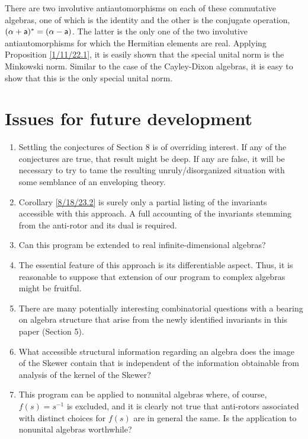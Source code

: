 \documentclass{amsart}
\theoremstyle{definition}
\numberwithin{theorem}{section}
\numberwithin{equation}{section}
\begin{document}
 There are two involutive antiautomorphisms on each of these commutative algebras, one of which is the identity and the other is the conjugate operation, $(\alpha+ {\sf a})^* = (\alpha- {\sf a})$. The latter is the only one of the two involutive antiautomorphisms  for which the Hermitian elements are real.  Applying Proposition \ref{1/11/22.1}, it is easily shown that the special unital norm is the Minkowski norm.  Similar to the case of the Cayley-Dixon algebras, it is easy to show that this is the only special unital norm.


\section{Issues for future development} 
\begin{enumerate}
\item Settling the conjectures of Section 8 is of overriding interest.  If any of the conjectures are true, that result might be deep.  If any are false, it will be necessary to try to tame the resulting unruly/disorganized situation with some semblance of an enveloping theory.
\item Corollary \ref{8/18/23.2} is surely only a partial listing of the invariants accessible with this approach.  A full accounting of the invariants stemming from the anti-rotor and its dual is required.
\item Can this program be extended to real infinite-dimensional algebras?
\item The essential feature of this approach is its differentiable aspect.  Thus, it is reasonable to suppose that extension of our program to complex algebras might be fruitful. 
\item There are many potentially interesting combinatorial questions with a bearing on algebra structure that arise from the newly identified invariants in this paper (Section 5). \item What accessible structural information regarding an algebra does the image of the Skewer contain that is independent of the information obtainable from analysis of the kernel of the Skewer? 
\item This program can be applied to nonunital algebras where, of course, $f(s)=s^{-1}$ is excluded, and it is clearly not true that anti-rotors associated with distinct choices for $f(s)$ are in general the same.  Is the application to nonunital algebras worthwhile?
\end{enumerate}

\vspace{.75cm}
\end{document}
